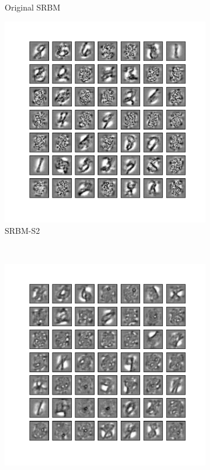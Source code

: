 \begin{figure}
\begin{subfigure}[t]{0.4\textwidth}
		\caption{Original SRBM}
	\end{subfigure}
	\begin{subfigure}[t]{0.4\textwidth}
		\includegraphics[width=\textwidth]{pics_sdlm/52_MNIST_SRBM_noise/2_60000_0.pdf}
		\caption{SRBM-S2}
	\end{subfigure}	\\
	\begin{subfigure}[t]{0.4\textwidth}
		\includegraphics[width=\textwidth]{pics_sdlm/51_MNIST_SRBM_teach/2_60000_0.pdf}

\end{subfigure}
\end{figure}
